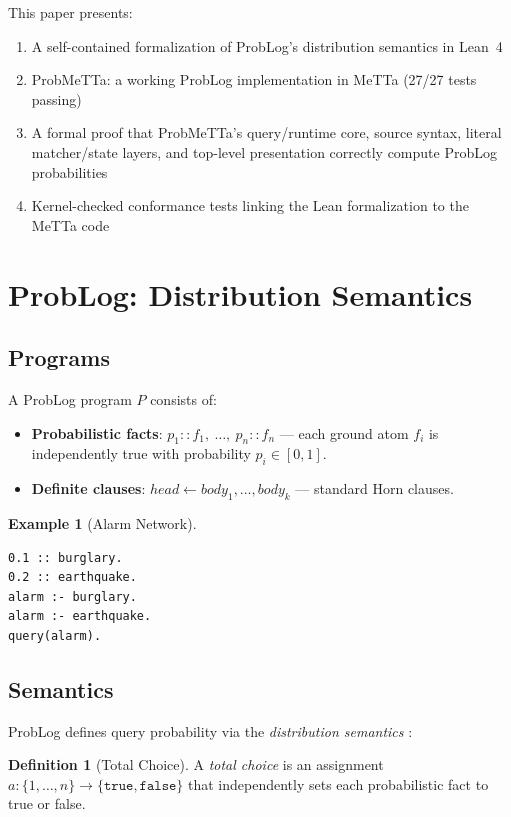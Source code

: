 \documentclass[11pt,a4paper]{article}
\theoremstyle{definition}
\newtheorem{definition}{Definition}[section]
\newtheorem{example}{Example}[section]
\begin{document}
This paper presents:
\begin{enumerate}
\item A self-contained formalization of ProbLog's distribution semantics in Lean~4
\item ProbMeTTa: a working ProbLog implementation in MeTTa (27/27 tests passing)
\item A formal proof that ProbMeTTa's query/runtime core, source syntax,
  literal matcher/state layers, and top-level presentation correctly compute
  ProbLog probabilities
\item Kernel-checked conformance tests linking the Lean formalization to the MeTTa code
\end{enumerate}

\section{ProbLog: Distribution Semantics}

\subsection{Programs}

A ProbLog program $P$ consists of:
\begin{itemize}
\item \textbf{Probabilistic facts}: $p_1\!::\!f_1,\ \ldots,\ p_n\!::\!f_n$ ---
  each ground atom $f_i$ is independently true with probability $p_i \in [0,1]$.
\item \textbf{Definite clauses}: $\mathit{head} \leftarrow \mathit{body}_1, \ldots, \mathit{body}_k$ ---
  standard Horn clauses.
\end{itemize}

\begin{example}[Alarm Network]
\begin{lstlisting}
0.1 :: burglary.
0.2 :: earthquake.
alarm :- burglary.
alarm :- earthquake.
query(alarm).
\end{lstlisting}
\end{example}

\subsection{Semantics}

ProbLog defines query probability via the \emph{distribution semantics}
\cite{sato1995}:

\begin{definition}[Total Choice]
A \emph{total choice} is an assignment $a : \{1,\ldots,n\} \to \{\texttt{true},\texttt{false}\}$
that independently sets each probabilistic fact to true or false.
\end{definition}
\end{document}

